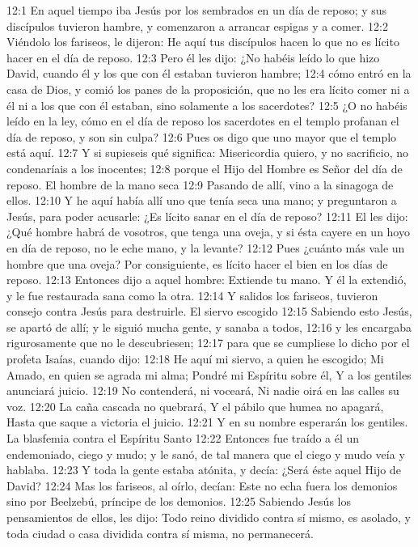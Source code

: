 12:1 En aquel tiempo iba Jesús por los sembrados en un día de reposo; y sus discípulos tuvieron hambre, y comenzaron a arrancar espigas y a comer. 
12:2 Viéndolo los fariseos, le dijeron: He aquí tus discípulos hacen lo que no es lícito hacer en el día de reposo. 
12:3 Pero él les dijo: ¿No habéis leído lo que hizo David, cuando él y los que con él estaban tuvieron hambre; 
12:4 cómo entró en la casa de Dios, y comió los panes de la proposición, que no les era lícito comer ni a él ni a los que con él estaban, sino solamente a los sacerdotes? 
12:5 ¿O no habéis leído en la ley, cómo en el día de reposo los sacerdotes en el templo profanan el día de reposo, y son sin culpa? 
12:6 Pues os digo que uno mayor que el templo está aquí. 
12:7 Y si supieseis qué significa: Misericordia quiero, y no sacrificio, no condenaríais a los inocentes; 
12:8 porque el Hijo del Hombre es Señor del día de reposo. 
El hombre de la mano seca  
12:9 Pasando de allí, vino a la sinagoga de ellos. 
12:10 Y he aquí había allí uno que tenía seca una mano; y preguntaron a Jesús, para poder acusarle: 
¿Es lícito sanar en el día de reposo? 
12:11 El les dijo: ¿Qué hombre habrá de vosotros, que tenga una oveja, y si ésta cayere en un hoyo en día de reposo, no le eche mano, y la levante? 
12:12 Pues ¿cuánto más vale un hombre que una oveja? Por consiguiente, es lícito hacer el bien en los días de reposo. 
12:13 Entonces dijo a aquel hombre: Extiende tu mano. Y él la extendió, y le fue restaurada sana como la otra. 
12:14 Y salidos los fariseos, tuvieron consejo contra Jesús para destruirle. 
El siervo escogido 
12:15 Sabiendo esto Jesús, se apartó de allí; y le siguió mucha gente, y sanaba a todos, 
12:16 y les encargaba rigurosamente que no le descubriesen; 
12:17 para que se cumpliese lo dicho por el profeta Isaías, cuando dijo: 
12:18 He aquí mi siervo, a quien he escogido; 
Mi Amado, en quien se agrada mi alma; 
Pondré mi Espíritu sobre él, 
Y a los gentiles anunciará juicio. 
12:19 No contenderá, ni voceará, 
Ni nadie oirá en las calles su voz. 
12:20 La caña cascada no quebrará, 
Y el pábilo que humea no apagará, 
Hasta que saque a victoria el juicio. 
12:21 Y en su nombre esperarán los gentiles. 
La blasfemia contra el Espíritu Santo  
12:22 Entonces fue traído a él un endemoniado, ciego y mudo; y le sanó, de tal manera que el ciego y mudo veía y hablaba. 
12:23 Y toda la gente estaba atónita, y decía: ¿Será éste aquel Hijo de David? 
12:24 Mas los fariseos, al oírlo, decían: Este no echa fuera los demonios sino por Beelzebú, príncipe de los demonios. 
12:25 Sabiendo Jesús los pensamientos de ellos, les dijo: Todo reino dividido contra sí mismo, es asolado, y toda ciudad o casa dividida contra sí misma, no permanecerá. 
